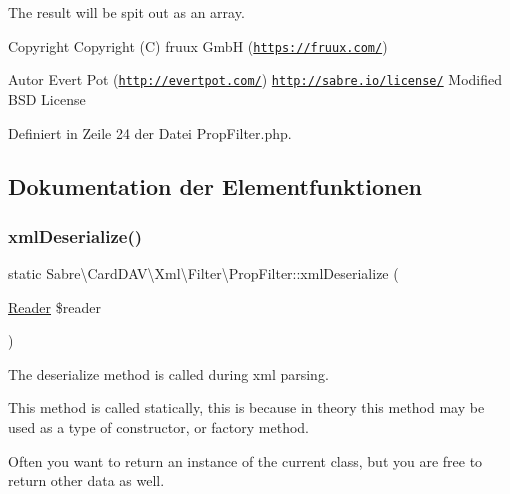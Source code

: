The result will be spit out as an array.

\begin{DoxyCopyright}{Copyright}
Copyright (C) fruux GmbH (\href{https://fruux.com/}{\tt https\+://fruux.\+com/}) 
\end{DoxyCopyright}
\begin{DoxyAuthor}{Autor}
Evert Pot (\href{http://evertpot.com/}{\tt http\+://evertpot.\+com/})  \href{http://sabre.io/license/}{\tt http\+://sabre.\+io/license/} Modified B\+SD License 
\end{DoxyAuthor}


Definiert in Zeile 24 der Datei Prop\+Filter.\+php.



\subsection{Dokumentation der Elementfunktionen}
\mbox{\label{class_sabre_1_1_card_d_a_v_1_1_xml_1_1_filter_1_1_prop_filter_a9e4d746653a1a05ca702ec481e8ad049}} 
\subsubsection{\texorpdfstring{xml\+Deserialize()}{xmlDeserialize()}}
{\footnotesize\ttfamily static Sabre\textbackslash{}\+Card\+D\+A\+V\textbackslash{}\+Xml\textbackslash{}\+Filter\textbackslash{}\+Prop\+Filter\+::xml\+Deserialize (\begin{DoxyParamCaption}\item[{\mbox{\hyperlink{class_sabre_1_1_xml_1_1_reader}{Reader}}}]{\$reader }\end{DoxyParamCaption})\hspace{0.3cm}{\ttfamily [static]}}

The deserialize method is called during xml parsing.

This method is called statically, this is because in theory this method may be used as a type of constructor, or factory method.

Often you want to return an instance of the current class, but you are free to return other data as well.

